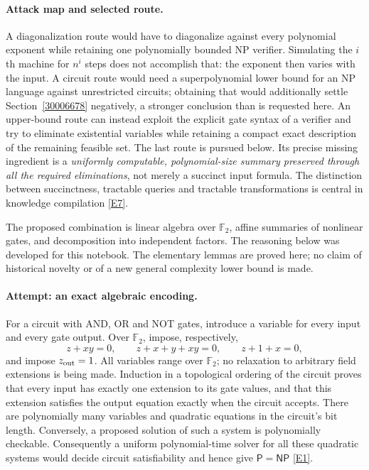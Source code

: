 \documentclass[11pt]{article}
\newcommand{\F}{\mathbb{F}}
\newcommand{\eref}[2]{\hyperlink{extra:#1:#2}{[E#2]}}
\begin{document}
\paragraph{Attack map and selected route.}
A diagonalization route would have to diagonalize against every polynomial
exponent while retaining one polynomially bounded NP verifier. Simulating the
$i$th machine for $n^i$ steps does not accomplish that: the exponent then varies
with the input. A circuit route would need a superpolynomial lower bound for
an NP language against unrestricted circuits; obtaining that would additionally
settle Section~\ref{30006678} negatively, a stronger conclusion than is requested
here. An upper-bound route can instead exploit the explicit gate syntax of a
verifier and try to eliminate existential variables while retaining a compact
exact description of the remaining feasible set. The last route is pursued
below. Its precise missing ingredient is a \emph{uniformly computable,
polynomial-size summary preserved through all the required eliminations},
not merely a succinct input formula. The distinction between succinctness,
tractable queries and tractable transformations is central in knowledge
compilation \eref{statement}{7}.

The proposed combination is linear algebra over $\F_2$, affine summaries of
nonlinear gates, and decomposition into independent factors. The reasoning
below was developed for this notebook. The elementary lemmas are proved here;
no claim of historical novelty or of a new general complexity lower bound is
made.

\paragraph{Attempt: an exact algebraic encoding.}
For a circuit with AND, OR and NOT gates, introduce a variable for every input
and every gate output. Over $\F_2$, impose, respectively,
\begin{equation}\label{ra:statement:gates}
 z+xy=0,\qquad z+x+y+xy=0,\qquad z+1+x=0,
\end{equation}
and impose $z_{\rm out}=1$. All variables range over $\F_2$; no relaxation to
arbitrary field extensions is being made. Induction in a topological ordering
of the circuit proves that every input has exactly one extension to its gate
values, and that this extension satisfies the output equation exactly when
the circuit accepts. There are polynomially many variables and quadratic
equations in the circuit's bit length. Conversely, a proposed solution of such
a system is polynomially checkable. Consequently a uniform polynomial-time
solver for all these quadratic systems would decide circuit satisfiability
and hence give $\mathsf P=\mathsf{NP}$ \eref{statement}{1}.
\end{document}
